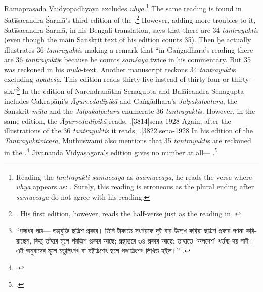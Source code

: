 Rāmaprasāda Vaidyopādhyāya excludes \emph{ūhya}.\footnote{Reading the \emph{tantrayukti} \emph{samuccaya} as \emph{asamuccaya}, he reads the verse where \emph{ūhya} appears as: 
	. Surely, this reading is erroneous as the plural ending after \emph{samuccaya} do not agree with his reading.} 
The same reading is found in Satīśacandra Śarmā's third edition of the 
\CS.\footnote{\cite[1020]{sarm-1923}. His first edition, however, reads the 
half-verse just as the reading in \cite{cara-trikamji}.\parencite[884]{sarm-1904}}
However, adding more troubles to it, Satīśacandra Śarmā, in his Bengali translation, 
says that there are 34 \emph{tantrayukti}s (even though the main Sanskrit text of 
his edition counts 35). Then ḥe actually illustrates 36 \emph{tantrayukti}s making a 
remark that “in Gaṅgadhara's reading there are 36 \emph{tantrayukti}s because he 
counts \emph{saṃśaya} twice in his commentary. But 35 was reckoned in his 
\emph{mūla}-text. Another manuscript reckons 34 \emph{tantrayukti}s excluding 
\emph{apadeśa}. This edition reads thirty-five instead of thirty-four or 
thirty-six.”\footnote{\textbengali{“গঙ্গাধর পাঠ— তন্ত্রযুক্তি ছত্রিশ প্রকার। তিনি টীকাতে সংশয়কে 
দুই বার উল্লেখ করিয়া ছত্রিশ প্রকার গণনা করিয়াছেন, কিন্তু তাঁহার মূলে পঁয়ত্রিশ প্রকার আছে; গ্রন্থান্তরে ৩৪ 
প্রকার আছে; তাহাতে ‘অপদেশ’ ধর্ত্তব্য হয় নাই। এই অনুবাদের মূলে চতুস্ত্রিংশৎ বা ষট্‌ত্রিংশৎ স্থলে 
পঞ্চত্রিংশৎ লিখিত হইল।”} \cite[1022]{sarm-1923}.} 
In the edition of Narendranātha Senagupta and Balāicandra Senagupta includes 
Cakrapāṇi's \emph{Āyurvedadīpikā} and Gaṅgādhara's \emph{Jalpakalpataru}, the 
Sanskrit \emph{mūla} and the \emph{Jalpakalpataru} enumerate 36 
\emph{tantrayukti}s. However, in the same edition, the \emph{Āyurvedadīpikā} 
reads, .[3814]{sena-1928} 
Again, after the illustrations of the 36 \emph{tantrayukti}s it reads, .[3822]{sena-1928} 
In his edition of the \emph{Tantrayuktivicāra}, Muthuswami also mentions that 35 \emph{tantrayukti}s are reckoned in the \CS.\footnote{\parencite[fn.2][2]{muth-1976}.} 
Jivānanda Vidyāsagara's edition gives no number at all--- .\footcite[961]{bhat-1877} 


